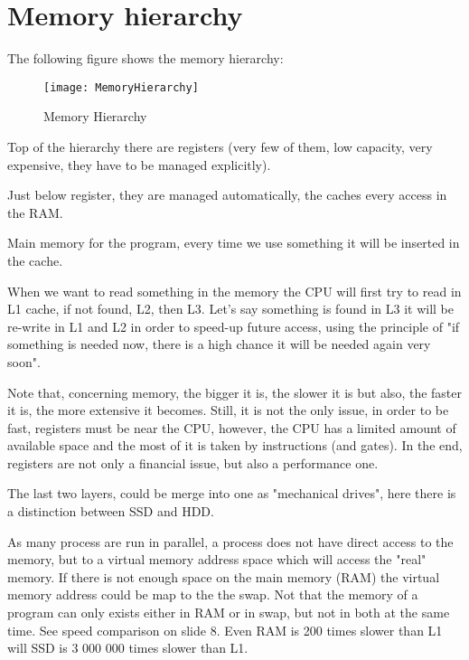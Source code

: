 \section{Memory hierarchy}
The following figure shows the memory hierarchy:
\begin{figure}[H]
     \centering
     \texttt{[image: MemoryHierarchy]}
     \caption{Memory Hierarchy}
     \label{fig:mem_hierar}
\end{figure}
\theoremstyle{definition}
\begin{definition}[Register]
    Top of the hierarchy there are registers (very few of them, low capacity,
very expensive, they have to be managed explicitly).
\end{definition}
\theoremstyle{definition}
\begin{definition}[Caches]
    Just below register, they are managed automatically, the caches every access
    in the RAM.
\end{definition}
\theoremstyle{definition}
\begin{definition}[RAM]
    Main memory for the program, every time we use something it will be inserted
    in the cache.
\end{definition}

When we want to read something in the memory the CPU will first try to read in
L1 cache, if not found, L2, then L3. Let's say something is found in L3 it will
be re-write in L1 and L2 in order to speed-up future access, using the principle
of "if something is needed now, there is a high chance it will be needed again
very soon". 

Note that, concerning memory, the bigger it is, the slower it is but also, the
faster it is, the more extensive it becomes. Still, it is not the only issue, in
order to be fast, registers must be near the CPU, however, the CPU has a limited
amount of available space and the most of it is taken by instructions (and
gates). In the end, registers are not only a financial issue, but also a
performance one.

The last two layers, could be merge into one as "mechanical drives", here there
is a distinction between SSD and HDD. 

As many process are run in parallel, a process does not have direct access to
the memory, but to a virtual memory address space which will access the "real"
memory. If there is not enough space on the main memory (RAM) the virtual memory
address could be map to the the swap. Not that the memory of a program can only
exists either in RAM or in swap, but not in both at the same time. See speed
comparison on slide 8. Even RAM is 200 times slower than L1 will SSD is 3 000
000 times slower than L1.

